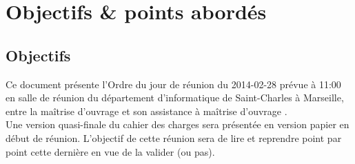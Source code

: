 \documentclass[11pt,fleqn]{report}
\begin{document}
\ZMakeCover


\chapter{Objectifs \& points abordés}

\section{Objectifs}
Ce document présente l'Ordre du jour de réunion du 2014-02-28 prévue à 11:00 en salle de réunion du département d'informatique de Saint-Charles à Marseille, entre la maîtrise d'ouvrage \mo et son assistance à maîtrise d'ouvrage \amo.
\\
Une version quasi-finale du cahier des charges sera présentée en version papier en début de réunion.
L'objectif de cette réunion sera de lire et reprendre point par point cette dernière en vue de la valider (ou pas).
\end{document}
